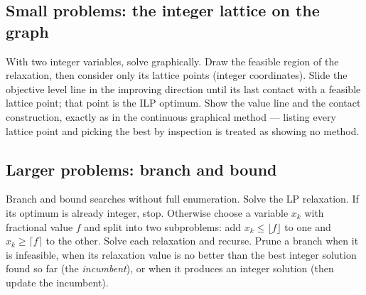 \documentclass[11pt,a4paper]{article}
\begin{document}
\subsection{Small problems: the integer lattice on the graph}
With two integer variables, solve graphically. Draw the feasible region of the relaxation, then consider only its lattice points (integer coordinates). Slide the objective level line in the improving direction until its last contact with a feasible lattice point; that point is the ILP optimum. Show the value line and the contact construction, exactly as in the continuous graphical method --- listing every lattice point and picking the best by inspection is treated as showing no method.

\subsection{Larger problems: branch and bound}
Branch and bound searches without full enumeration. Solve the LP relaxation. If its optimum is already integer, stop. Otherwise choose a variable $x_k$ with fractional value $f$ and split into two subproblems: add $x_k\leq\lfloor f\rfloor$ to one and $x_k\geq\lceil f\rceil$ to the other. Solve each relaxation and recurse. Prune a branch when it is infeasible, when its relaxation value is no better than the best integer solution found so far (the \emph{incumbent}), or when it produces an integer solution (then update the incumbent).
\end{document}
